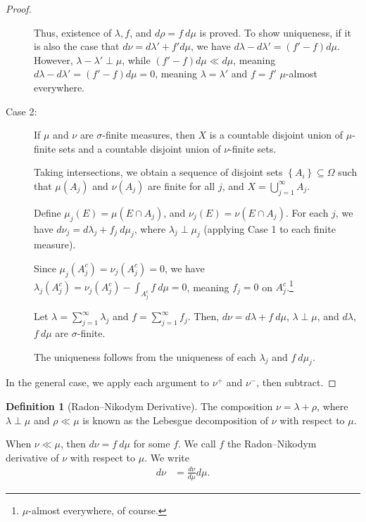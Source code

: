 \documentclass[10pt]{extarticle}
\newcommand{\set}[1]{\left\{#1\right\}}
\theoremstyle{plain}
\theoremstyle{definition}
\newtheorem*{definition}{Definition}
\theoremstyle{note}
\renewcommand{\newline}{\hfill\break}
\begin{document}
\begin{proof}
\begin{description}
      Thus, existence of $\lambda,f$, and $d\rho = f\:d\mu$ is proved. To show uniqueness, if it is also the case that $d\nu = d\lambda' + f'd\mu$, we have $d\lambda - d\lambda' = \left(f' - f\right)d\mu$. However, $\lambda - \lambda' \perp \mu$, while $\left(f' - f\right)d\mu \ll d\mu$, meaning $d\lambda - d\lambda' = \left(f'-f\right)d\mu = 0$, meaning $\lambda = \lambda '$ and $f = f'$ $\mu$-almost everywhere.
    \item[Case 2:] If $\mu$ and $\nu$ are $\sigma$-finite measures, then $X$ is a countable disjoint union of $\mu$-finite sets and a countable disjoint union of $\nu$-finite sets.\newline

      Taking intersections, we obtain a sequence of disjoint sets $\set{A_i}\subseteq \Omega$ such that $\mu\left(A_j\right)$ and $\nu\left(A_j\right)$ are finite for all $j$, and $X = \bigcup_{j=1}^{\infty}A_j$.\newline

      Define $\mu_j \left(E\right) = \mu\left(E\cap A_j\right)$, and $\nu_j\left(E\right) = \nu\left(E\cap A_j\right)$. For each $j$, we have $d\nu_j = d\lambda_j + f_j\:d\mu_j$, where $\lambda_j \perp \mu_j$ (applying Case 1 to each finite measure).\newline

      Since $\mu_j\left(A^{c}_j\right) = \nu_j\left(A^{c}_j\right) = 0$, we have $\lambda_j\left(A_j^{c}\right) = \nu_j\left(A_j^{c}\right) - \int_{A_{j}^c}^{} f\:d\mu = 0$, meaning $f_j = 0 $ on $A_{j}^c$.\footnote{$\mu$-almost everywhere, of course.}\newline

      Let $\lambda = \sum_{j=1}^{\infty}\lambda_j$ and $f = \sum_{j=1}^{\infty}f_j$. Then, $d\nu = d\lambda + f\:d\mu$, $\lambda \perp \mu$, and $d\lambda$, $f\:d\mu$ are $\sigma$-finite.\newline

      The uniqueness follows from the uniqueness of each $\lambda_j$ and $f\:d\mu_j$.
  \end{description}
  In the general case, we apply each argument to $\nu^{+}$ and $\nu^{-}$, then subtract.
\end{proof}
\begin{definition}[Radon--Nikodym Derivative]
  The composition $\nu = \lambda + \rho$, where $\lambda \perp \mu$ and $\rho \ll \mu$ is known as the Lebesgue decomposition of $\nu$ with respect to $\mu$.\newline

  When $\nu \ll \mu$, then $d\nu = f\:d\mu$ for some $f$. We call $f$ the Radon--Nikodym derivative of $\nu$ with respect to $\mu$. We write
  \begin{align*}
    d\nu &= \frac{d\nu}{d\mu} d\mu.
  \end{align*}
\end{definition}
\end{document}
